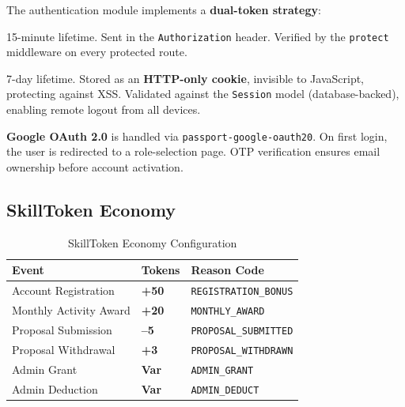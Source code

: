 The authentication module implements a \textbf{dual-token strategy}:

\begin{featurebox}
\begin{description}[leftmargin=2cm, style=sameline]
  \item[\bfseries Access JWT]  15-minute lifetime. Sent in the \texttt{Authorization}
        header. Verified by the \texttt{protect} middleware on every protected route.
  \item[\bfseries Refresh JWT] 7-day lifetime. Stored as an \textbf{HTTP-only cookie},
        invisible to JavaScript, protecting against XSS. Validated against the
        \texttt{Session} model (database-backed), enabling remote logout from all devices.
\end{description}
\end{featurebox}

\textbf{Google OAuth 2.0} is handled via \texttt{passport-google-oauth20}. On first
login, the user is redirected to a role-selection page. OTP verification ensures email
ownership before account activation.

\subsection{SkillToken Economy}

\begin{table}[h]
\centering
\caption{SkillToken Economy Configuration}
\label{tab:token_config}
\renewcommand{\arraystretch}{1.4}
\begin{tabular}{|p{4.5cm}|>{\centering\arraybackslash}p{2.5cm}|p{6cm}|}
\hline
\rowcolor{sblight}
\textbf{Event} & \textbf{Tokens} & \textbf{Reason Code} \\ \hline
Account Registration  & \textcolor{sbaccent}{\textbf{+50}} & \texttt{REGISTRATION\_BONUS} \\ \hline
Monthly Activity Award& \textcolor{sbaccent}{\textbf{+20}} & \texttt{MONTHLY\_AWARD} \\ \hline
Proposal Submission   & \textcolor{sborange}{\textbf{--5}} & \texttt{PROPOSAL\_SUBMITTED} \\ \hline
Proposal Withdrawal   & \textcolor{sbaccent}{\textbf{+3}}  & \texttt{PROPOSAL\_WITHDRAWN} \\ \hline
Admin Grant           & \textcolor{sbaccent}{\textbf{Var}} & \texttt{ADMIN\_GRANT} \\ \hline
Admin Deduction       & \textcolor{sborange}{\textbf{Var}} & \texttt{ADMIN\_DEDUCT} \\ \hline
\end{tabular}
\end{table}

